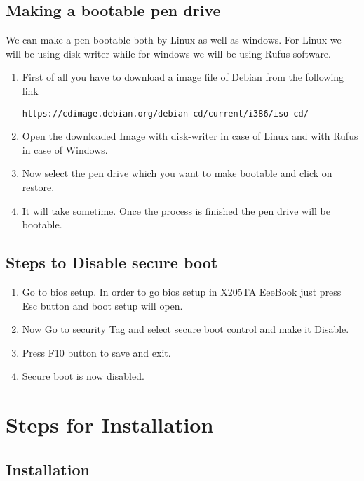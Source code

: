 \documentclass[journal,12pt,twocolumn]{IEEEtran}
\begin{document}
\subsection{Making a bootable pen drive}
We can make a pen bootable both by Linux as well as windows. For Linux we will be using disk-writer while for windows we will be using Rufus software.
\begin{enumerate}
\item First of all you have to download a image file of Debian from the following link
\begin{lstlisting}
https://cdimage.debian.org/debian-cd/current/i386/iso-cd/
\end{lstlisting}
\item Open the downloaded Image with disk-writer in case of Linux and with Rufus in case of Windows.
\item Now select the pen drive which you want to make bootable and click on restore.
\item It will take sometime. Once the process is finished the pen drive will be bootable.
\end{enumerate}

\subsection{Steps to Disable secure boot}
\begin{enumerate}
 
\item Go to bios setup. In order to go bios setup in X205TA EeeBook just press Esc button and boot setup will open.
\item Now Go to security Tag and select secure boot control and make it Disable.
\item Press F10 button to save and exit.
\item Secure boot is now disabled.

\end{enumerate}






%
\section{Steps for Installation  }
\subsection{\textbf{Installation}}
\end{document}
